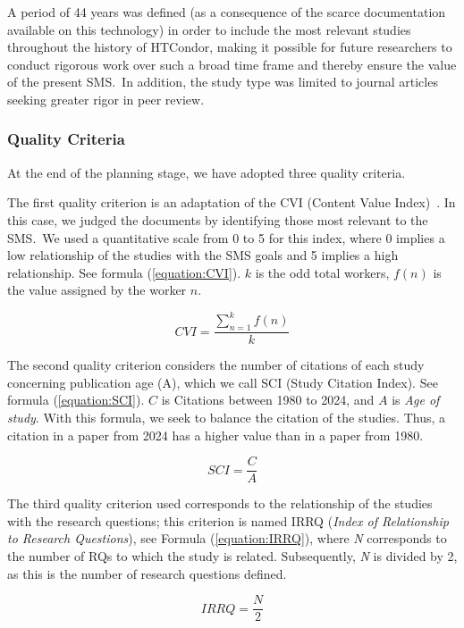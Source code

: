 A period of 44 years was defined (as a consequence of the scarce documentation available on this technology) in order to include the most relevant studies throughout the history of HTCondor, making it possible for future researchers to conduct rigorous work over such a broad time frame and thereby ensure the value of the present SMS.~In addition, the study type was limited to journal articles seeking greater rigor in peer review.



\subsubsection{Quality Criteria}
At the end of the planning stage, we have adopted three quality criteria.

The first quality criterion is an adaptation of the CVI (Content Value Index)~\cite{Almanasreh2019214, yaghmaei2003content}. In this case, we judged the documents by identifying those most relevant to the SMS.~We used a quantitative scale from 0 to 5 for this index, where 0 implies a low relationship of the studies with the SMS goals and 5 implies a high relationship. See formula (\ref{equation:CVI}). $k$ is the odd total workers, $f(n)$ is the value assigned by the worker $n$.

\begin{equation}
\label{equation:CVI}
CVI = \frac{\sum_{n=1}^{k} f(n)}{k}
\end{equation}

The second quality criterion considers the number of citations of each study concerning publication age  (A), which we call SCI (Study Citation Index). See  formula (\ref{equation:SCI}). $C$ is Citations between 1980 to 2024, and $A$ is \textit{Age of study}. With this formula, we seek to balance the citation of the studies. Thus, a citation in a  paper from 2024 has a higher value than in a paper from 1980.
 

\begin{equation}
	\label{equation:SCI}
	SCI = \frac{C}{A}
\end{equation}


\hbox{}
The third quality criterion used corresponds to the relationship of the studies with the research questions; this criterion is named IRRQ (\textit{Index of Relationship to Research Questions}), see Formula (\ref{equation:IRRQ}), where \textit{N} corresponds to the number of RQs to which the study is related. Subsequently, \textit{N} is divided by 2, as this is the number of research questions defined.

\begin{equation}
	\label{equation:IRRQ}
	IRRQ = \frac{N}{2}
\end{equation}

